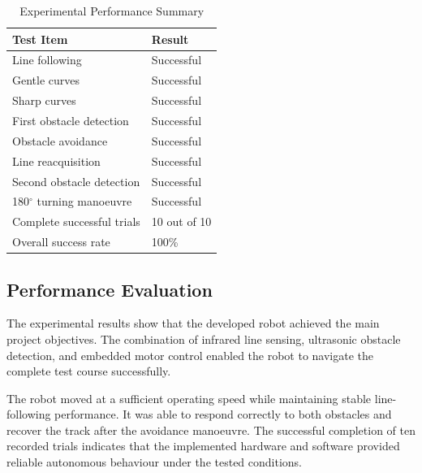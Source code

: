 \begin{table}[ht]
\caption{Experimental Performance Summary}
\centering
\begin{tabular}{ll}
\hline
\textbf{Test Item} & \textbf{Result} \\
\hline
Line following & Successful \\
Gentle curves & Successful \\
Sharp curves & Successful \\
First obstacle detection & Successful \\
Obstacle avoidance & Successful \\
Line reacquisition & Successful \\
Second obstacle detection & Successful \\
180$^\circ$ turning manoeuvre & Successful \\
Complete successful trials & 10 out of 10 \\
Overall success rate & 100\% \\
\hline
\end{tabular}
\label{tab:testing_results}
\end{table}

\subsection{Performance Evaluation}

The experimental results show that the developed robot achieved the main project objectives. The combination of infrared line sensing, ultrasonic obstacle detection, and embedded motor control enabled the robot to navigate the complete test course successfully.

The robot moved at a sufficient operating speed while maintaining stable line-following performance. It was able to respond correctly to both obstacles and recover the track after the avoidance manoeuvre. The successful completion of ten recorded trials indicates that the implemented hardware and software provided reliable autonomous behaviour under the tested conditions.
